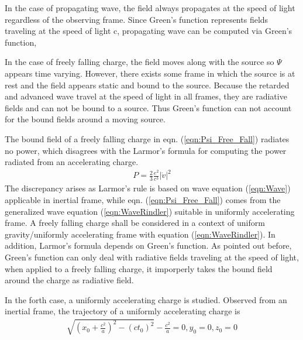 \documentclass[prd,showpacs,preprint]{revtex4}
\begin{document}
In the case of propagating wave, the field always propagates at the speed of light regardless of the observing frame. Since Green's function represents fields traveling at the speed of light c, propagating wave can be computed via Green's function,

In the case of freely falling charge, the field moves along with the source so $\Psi$ appears time varying. However, there exists some frame in which the source is at rest and the field appears static and bound to the source. Because the retarded and advanced wave travel at the speed of light in all frames, they are radiative fields and can not be bound to a source. Thus Green's function can not account for the bound fields around a moving source.

The bound field of a freely falling charge in eqn. (\ref{eqn:Psi_Free_Fall}) radiates no power, which disagrees with the Larmor's formula for computing the power radiated from an accelerating charge. \cite{Jackson}
\begin{eqnarray}
P=\frac{2}{3}\frac{e^2}{c^3}|\dot v|^2
\label{eqn:Larmor}
\end{eqnarray}
The discrepancy arises as Larmor's rule is based on wave equation (\ref{eqn:Wave}) applicable in inertial frame, while eqn. (\ref{eqn:Psi_Free_Fall}) comes from the generalized wave equation (\ref{eqn:WaveRindler}) suitable in uniformly accelerating frame. A freely falling charge shall be considered in a context of uniform gravity/uniformly accelerating frame with equation (\ref{eqn:WaveRindler}). In addition, Larmor's formula depends on Green's function. As pointed out before, Green's function can only deal with radiative fields traveling at the speed of light, when applied to a freely falling charge, it imporperly takes the bound field around the charge as radiative field.

In the forth case, a uniformly accelerating charge is studied. Observed from an inertial frame, the trajectory of a uniformly accelerating charge is
\begin{eqnarray}
\sqrt{(x_0+\frac{c^2}{a})^2-(ct_0)^2}-\frac{c^2}{a}=0,y_0=0,z_0=0
\label{eqn:Trajectory_Accelerating}
\end{eqnarray}
\end{document}
